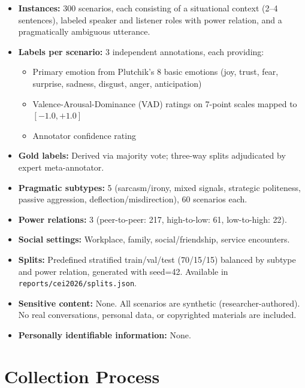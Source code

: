 \documentclass[11pt]{article}
\begin{document}
\begin{itemize}[leftmargin=*]
    \item \textbf{Instances:} 300 scenarios, each consisting of a situational context (2--4 sentences), labeled speaker and listener roles with power relation, and a pragmatically ambiguous utterance.
    \item \textbf{Labels per scenario:} 3 independent annotations, each providing:
    \begin{itemize}
        \item Primary emotion from Plutchik's 8 basic emotions (joy, trust, fear, surprise, sadness, disgust, anger, anticipation)
        \item Valence-Arousal-Dominance (VAD) ratings on 7-point scales mapped to $[-1.0, +1.0]$
        \item Annotator confidence rating
    \end{itemize}
    \item \textbf{Gold labels:} Derived via majority vote; three-way splits adjudicated by expert meta-annotator.
    \item \textbf{Pragmatic subtypes:} 5 (sarcasm/irony, mixed signals, strategic politeness, passive aggression, deflection/misdirection), 60 scenarios each.
    \item \textbf{Power relations:} 3 (peer-to-peer: 217, high-to-low: 61, low-to-high: 22).
    \item \textbf{Social settings:} Workplace, family, social/friendship, service encounters.
    \item \textbf{Splits:} Predefined stratified train/val/test (70/15/15) balanced by subtype and power relation, generated with seed=42. Available in \texttt{reports/cei2026/splits.json}.
    \item \textbf{Sensitive content:} None. All scenarios are synthetic (researcher-authored). No real conversations, personal data, or copyrighted materials are included.
    \item \textbf{Personally identifiable information:} None.
\end{itemize}

\section{Collection Process}
\end{document}
